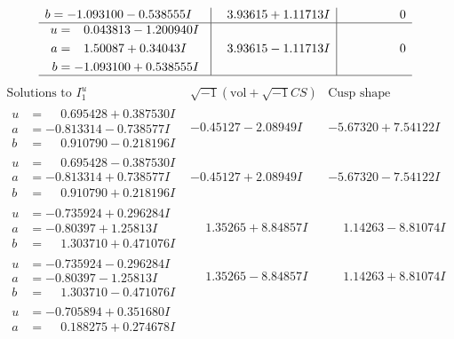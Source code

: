 \documentclass[1p]{elsarticle_modified}
\theoremstyle{definition}
\newcommand{\I}{\sqrt{-1}}
\begin{document}
$$\begin{array}{c|c|c}
\begin{aligned}
b &= -1.093100 - 0.538555 I\end{aligned}
 & \phantom{-}3.93615 + 1.11713 I & \phantom{-0.000000 } 0 \\ \hline\begin{aligned}
u &= \phantom{-}0.043813 - 1.200940 I \\
a &= \phantom{-}1.50087 + 0.34043 I \\
b &= -1.093100 + 0.538555 I\end{aligned}
 & \phantom{-}3.93615 - 1.11713 I & \phantom{-0.000000 } 0\\
 \hline 
 \end{array}$$\newpage$$\begin{array}{c|c|c}  
\text{Solutions to }I^u_{1}& \I (\text{vol} + \sqrt{-1}CS) & \text{Cusp shape}\\
 \hline 
\begin{aligned}
u &= \phantom{-}0.695428 + 0.387530 I \\
a &= -0.813314 - 0.738577 I \\
b &= \phantom{-}0.910790 - 0.218196 I\end{aligned}
 & -0.45127 - 2.08949 I & -5.67320 + 7.54122 I \\ \hline\begin{aligned}
u &= \phantom{-}0.695428 - 0.387530 I \\
a &= -0.813314 + 0.738577 I \\
b &= \phantom{-}0.910790 + 0.218196 I\end{aligned}
 & -0.45127 + 2.08949 I & -5.67320 - 7.54122 I \\ \hline\begin{aligned}
u &= -0.735924 + 0.296284 I \\
a &= -0.80397 + 1.25813 I \\
b &= \phantom{-}1.303710 + 0.471076 I\end{aligned}
 & \phantom{-}1.35265 + 8.84857 I & \phantom{-}1.14263 - 8.81074 I \\ \hline\begin{aligned}
u &= -0.735924 - 0.296284 I \\
a &= -0.80397 - 1.25813 I \\
b &= \phantom{-}1.303710 - 0.471076 I\end{aligned}
 & \phantom{-}1.35265 - 8.84857 I & \phantom{-}1.14263 + 8.81074 I \\ \hline\begin{aligned}
u &= -0.705894 + 0.351680 I \\
a &= \phantom{-}0.188275 + 0.274678 I \\

\end{aligned}
\end{array}$$
\end{document}
